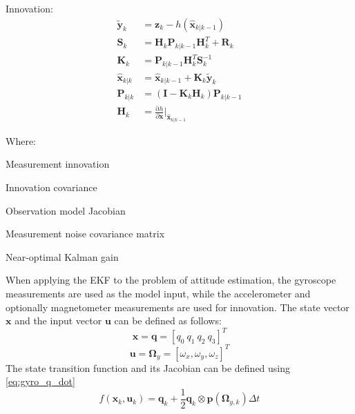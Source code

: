 Innovation:
\begin{equation}
	\begin{aligned}
		\tilde{\boldsymbol{y}}_k   & = \boldsymbol{z}_k - h(\hat{\boldsymbol{x}}_{k|k-1})                            \\
		\boldsymbol{S}_k           & = \boldsymbol{H}_k \boldsymbol{P}_{k|k-1} \boldsymbol{H}_k^T + \boldsymbol{R}_k \\
		\boldsymbol{K}_k           & = \boldsymbol{P}_{k|k-1} \boldsymbol{H}_k^T \boldsymbol{S}_k^{-1}               \\
		\hat{\boldsymbol{x}}_{k|k} & = \hat{\boldsymbol{x}}_{k|k-1} + \boldsymbol{K}_k \tilde{\boldsymbol{y}}_k      \\
		\boldsymbol{P}_{k|k}       & = (\mathbf{I} - \boldsymbol{K}_k\boldsymbol{H}_k)\boldsymbol{P}_{k|k-1}         \\
		\boldsymbol{H}_k           & = \frac{\mathrm{\partial} h}{\partial \boldsymbol{x}}|_{\hat{\boldsymbol{x}}_{k|k-1}}
	\end{aligned}
\end{equation}

Where:
\begin{eqwhere}[3cm]
	\item[$\boldsymbol{y}_k$] Measurement innovation
	\item[$\boldsymbol{S}_k$] Innovation covariance
	\item[$\boldsymbol{H}_k$] Observation model Jacobian
	\item[$\boldsymbol{R}_k$] Measurement noise covariance matrix
	\item[$\boldsymbol{K}_k$] Near-optimal Kalman gain
\end{eqwhere}

\newpage

When applying the EKF to the problem of attitude estimation, the gyroscope measurements are used as the model input, while the accelerometer and optionally magnetometer measurements are used for innovation.
The state vector $\boldsymbol{x}$ and the input vector $\boldsymbol{u}$ can be defined as follows:
%
\begin{equation}
	\boldsymbol{x} = \boldsymbol{q} = \left[ q_0\ q_1\ q_2\ q_3 \right]^T
\end{equation}
%
\begin{equation}
	\boldsymbol{u} = \boldsymbol{\Omega}_{y} = \left[ \omega_{x}, \omega_{y}, \omega_{z} \right]^T
\end{equation}
%
The state transition function and its Jacobian can be defined using \eqref{eq:gyro_q_dot}
\begin{equation}
	f(\boldsymbol{x}_{k}, \boldsymbol{u}_{k}) = \boldsymbol{q}_{k} + \frac{1}{2}\boldsymbol{q}_{k} \otimes \boldsymbol{p}(\boldsymbol{\Omega}_{y,k})\Delta t
\end{equation}

